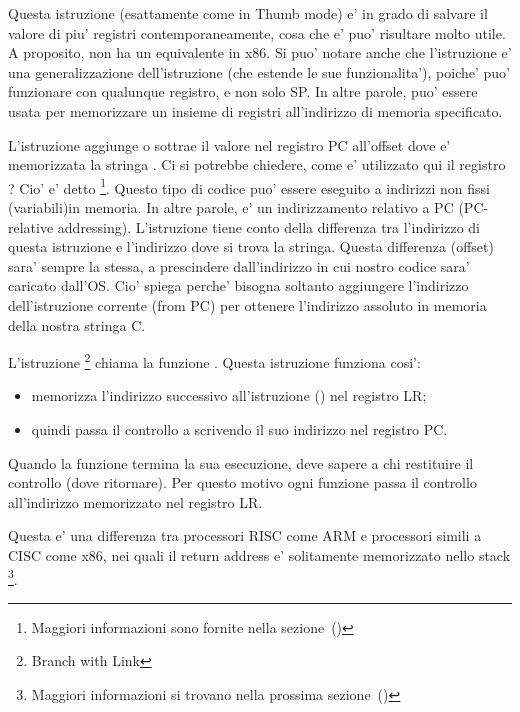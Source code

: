 Questa istruzione (esattamente come \PUSH in Thumb mode) e' in grado di salvare il valore di piu' registri contemporaneamente, cosa che e' puo' risultare molto utile. 
A proposito, non ha un equivalente in x86.
Si puo' notare anche che l'istruzione  e' una generalizzazione dell'istruzione \PUSH (che estende le sue funzionalita'), poiche' puo' funzionare con qualunque registro, e non solo \ac{SP}.
In altre parole,  puo' essere usata per memorizzare un insieme di registri all'indirizzo di memoria specificato.

\index{\PICcode}
L'istruzione 
aggiunge o sottrae il valore nel registro \ac{PC} all'offset dove e' memorizzata la stringa .
Ci si potrebbe chiedere, come e' utilizzato qui il registro ?
Cio' e' detto \q{\PICcode}
\footnote{Maggiori informazioni sono fornite nella sezione~()}.
Questo tipo di codice puo' essere eseguito a indirizzi non fissi (variabili)in memoria.
In altre parole, e' un indirizzamento relativo a \ac{PC} (\ac{PC}-relative addressing).
L'istruzione  tiene conto della differenza tra l'indirizzo di questa istruzione e l'indirizzo dove si trova la stringa.
Questa differenza (offset) sara' sempre la stessa, a prescindere dall'indirizzo in cui nostro codice sara' caricato dall'\ac{OS}.
Cio' spiega perche' bisogna soltanto aggiungere l'indirizzo dell'istruzione corrente (from \ac{PC}) per ottenere l'indirizzo assoluto in memoria della nostra stringa C.

L'istruzione \footnote{Branch with Link} chiama la funzione \printf. 
Questa istruzione funziona cosi': 
\begin{itemize}
\item memorizza l'indirizzo successivo all'istruzione  () nel registro \ac{LR};
\item quindi passa il controllo a \printf scrivendo il suo indirizzo nel registro \ac{PC}.
\end{itemize}

Quando la funzione \printf termina la sua esecuzione, deve sapere a chi restituire il controllo (dove ritornare). Per questo motivo ogni funzione passa il controllo all'indirizzo memorizzato nel registro \ac{LR}.

Questa e' una differenza tra processori \ac{RISC}  come ARM e processori simili a \ac{CISC} come x86, nei quali il return address e' solitamente memorizzato nello stack
\footnote{Maggiori informazioni si trovano nella prossima sezione~()}.

